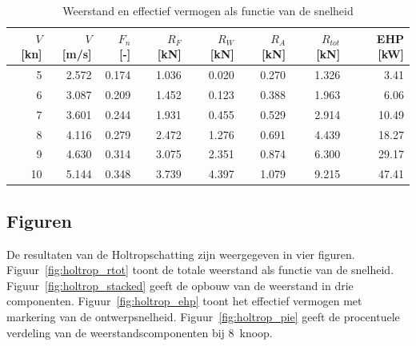 \begin{table}[h!]
\centering
\caption{Weerstand en effectief vermogen als functie van de snelheid}
\label{tab:holtrop_speed_series}
\begin{tabular}{rrrrrrrr}
\toprule
$V$ [kn] & $V$ [m/s] & $F_n$ [-] & $R_F$ [kN] & $R_W$ [kN] & $R_A$ [kN] & $R_{tot}$ [kN] & EHP [kW] \\
\midrule
5  & 2.572 & 0.174 & 1.036 & 0.020 & 0.270 & 1.326 &  3.41 \\
6  & 3.087 & 0.209 & 1.452 & 0.123 & 0.388 & 1.963 &  6.06 \\
7  & 3.601 & 0.244 & 1.931 & 0.455 & 0.529 & 2.914 & 10.49 \\
\rowcolor{green!15}
8  & 4.116 & 0.279 & 2.472 & 1.276 & 0.691 & 4.439 & 18.27 \\
9  & 4.630 & 0.314 & 3.075 & 2.351 & 0.874 & 6.300 & 29.17 \\
10 & 5.144 & 0.348 & 3.739 & 4.397 & 1.079 & 9.215 & 47.41 \\
\bottomrule
\end{tabular}
\end{table}


\newpage
\subsection{Figuren}
\label{subsec:holtrop_figuren}

De resultaten van de Holtropschatting zijn weergegeven in vier figuren. Figuur~\ref{fig:holtrop_rtot} toont de totale weerstand als functie van de snelheid. Figuur~\ref{fig:holtrop_stacked} geeft de opbouw van de weerstand in drie componenten. Figuur~\ref{fig:holtrop_ehp} toont het effectief vermogen met markering van de ontwerpsnelheid. Figuur~\ref{fig:holtrop_pie} geeft de procentuele verdeling van de weerstandscomponenten bij 8~knoop.

